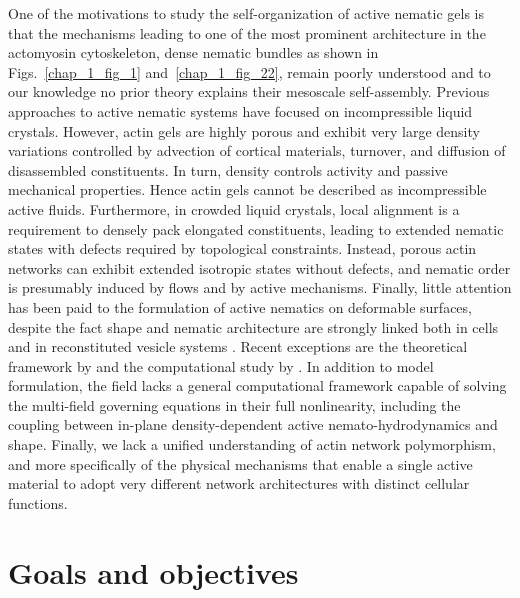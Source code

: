 One of the motivations to study the self-organization of active nematic gels is that the mechanisms leading to one of the most prominent architecture in the actomyosin cytoskeleton, dense nematic bundles as shown in Figs.~\ref{chap_1_fig_1} and~\ref{chap_1_fig_22}, remain poorly understood and to our knowledge no prior theory explains their mesoscale self-assembly. Previous approaches to active nematic systems have focused on incompressible liquid crystals. However, actin gels are highly porous and exhibit very large density variations controlled by advection of cortical materials, turnover, and diffusion of disassembled constituents. In turn, density controls activity and passive mechanical properties. Hence actin gels cannot be described as incompressible active fluids. Furthermore, in crowded liquid crystals, local alignment is a requirement to densely pack elongated constituents, leading to extended nematic states with defects required by topological constraints. Instead, porous actin networks can exhibit extended isotropic states without defects, and nematic order is presumably induced by flows and by active mechanisms. Finally, little attention has been paid to the formulation of active nematics on deformable surfaces, despite the fact shape and nematic architecture are strongly linked  both in cells and in reconstituted vesicle systems  \cite{anne2016, Dong,mandato2001,weirich2019,keber2014}. Recent exceptions are the theoretical framework by \citet{salbreux2022} and the computational study by \citet{https://doi.org/10.48550/arxiv.2205.06805}. In addition to model formulation, the field lacks a general computational framework capable of solving the multi-field governing equations in their full nonlinearity, including the coupling between in-plane density-dependent active nemato-hydrodynamics and shape. Finally, we lack a unified understanding of actin network polymorphism, and more specifically of the physical mechanisms that enable a single active material to adopt very different network architectures with distinct cellular functions. 


\section{Goals and objectives}

